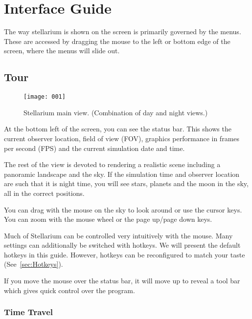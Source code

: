 

\chapter{Interface Guide}
\label{ch:interface}

The way stellarium is shown on the screen is primarily governed by the
menus. These are accessed by dragging the mouse to the left or bottom
edge of the screen, where the menus will slide out.

\section{Tour}
\label{sec:interface:tour}

\begin{figure}[tbh]\centering
\texttt{[image: 001]}
\caption{Stellarium main view. (Combination of day and night views.)}
\label{fig:001}
\end{figure}

At the bottom left of the screen, you can see the status bar. This shows
the current observer location, field of view (FOV), graphics performance
in frames per second (FPS) and the current simulation date and time.

The rest of the view is devoted to rendering a realistic scene including
a panoramic landscape and the sky. If the simulation time and observer
location are such that it is night time, you will see stars, planets and
the moon in the sky, all in the correct positions.

You can drag with the mouse on the sky to look around or use the cursor
keys. You can zoom with the mouse wheel or the page up/page down keys.

Much of Stellarium can be controlled very intuitively with the
mouse. Many settings can additionally be switched with
hotkeys. We will present the default hotkeys in this guide. However,
hotkeys can be reconfigured to match your taste
(See~\ref{sec:Hotkeys}).

If you move the mouse over the status bar, it will move up to reveal a
tool bar which gives quick control over the program.

\subsection{Time Travel}
\label{sec:interface:timeTravel}

